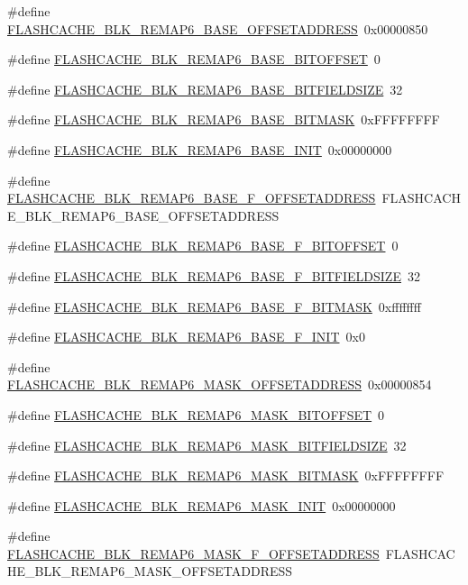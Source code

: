 \begin{DoxyCompactItemize}
\#define \hyperlink{a00550_af8e627f0b0dd219fde52ab8b79c9d9b9}{FLASHCACHE\_\-BLK\_\-REMAP6\_\-BASE\_\-OFFSETADDRESS}~0x00000850
\item 
\#define \hyperlink{a00550_a34ee6956222c5039352f344edfe1ee03}{FLASHCACHE\_\-BLK\_\-REMAP6\_\-BASE\_\-BITOFFSET}~0
\item 
\#define \hyperlink{a00550_aaa5796bf009a6acbde40d9f6489a9ce3}{FLASHCACHE\_\-BLK\_\-REMAP6\_\-BASE\_\-BITFIELDSIZE}~32
\item 
\#define \hyperlink{a00550_a2fa8013a760a149ba5d13ec18d8b7ba6}{FLASHCACHE\_\-BLK\_\-REMAP6\_\-BASE\_\-BITMASK}~0xFFFFFFFF
\item 
\#define \hyperlink{a00550_a15415f674897444a17d31919bdd2558e}{FLASHCACHE\_\-BLK\_\-REMAP6\_\-BASE\_\-INIT}~0x00000000
\item 
\#define \hyperlink{a00550_a24c0b7a5e540f259d7db0150a0430a7b}{FLASHCACHE\_\-BLK\_\-REMAP6\_\-BASE\_\-F\_\-OFFSETADDRESS}~FLASHCACHE\_\-BLK\_\-REMAP6\_\-BASE\_\-OFFSETADDRESS
\item 
\#define \hyperlink{a00550_a7b17e483f06c9a00b964d4e48ea14049}{FLASHCACHE\_\-BLK\_\-REMAP6\_\-BASE\_\-F\_\-BITOFFSET}~0
\item 
\#define \hyperlink{a00550_a5540f4068e1d5ac53f812a72092077ab}{FLASHCACHE\_\-BLK\_\-REMAP6\_\-BASE\_\-F\_\-BITFIELDSIZE}~32
\item 
\#define \hyperlink{a00550_a6b10d8ab83517ea3df8f266701e5ce7e}{FLASHCACHE\_\-BLK\_\-REMAP6\_\-BASE\_\-F\_\-BITMASK}~0xffffffff
\item 
\#define \hyperlink{a00550_aa2a2145cc87bacc938c037f4e1a9e2ac}{FLASHCACHE\_\-BLK\_\-REMAP6\_\-BASE\_\-F\_\-INIT}~0x0
\item 
\#define \hyperlink{a00550_a4e507d74c314fdc4247c74dd8d91cb2e}{FLASHCACHE\_\-BLK\_\-REMAP6\_\-MASK\_\-OFFSETADDRESS}~0x00000854
\item 
\#define \hyperlink{a00550_aac3a457e5375dd8699a5629ce3bf59ed}{FLASHCACHE\_\-BLK\_\-REMAP6\_\-MASK\_\-BITOFFSET}~0
\item 
\#define \hyperlink{a00550_a77a80e767642694d5430099f3675203f}{FLASHCACHE\_\-BLK\_\-REMAP6\_\-MASK\_\-BITFIELDSIZE}~32
\item 
\#define \hyperlink{a00550_ad4c6d6c489d6045e768143afd8cbd282}{FLASHCACHE\_\-BLK\_\-REMAP6\_\-MASK\_\-BITMASK}~0xFFFFFFFF
\item 
\#define \hyperlink{a00550_ab620f9e390b937187c497a054a5731b8}{FLASHCACHE\_\-BLK\_\-REMAP6\_\-MASK\_\-INIT}~0x00000000
\item 
\#define \hyperlink{a00550_a15c4b7b7818599886918428b615d51f7}{FLASHCACHE\_\-BLK\_\-REMAP6\_\-MASK\_\-F\_\-OFFSETADDRESS}~FLASHCACHE\_\-BLK\_\-REMAP6\_\-MASK\_\-OFFSETADDRESS

\end{DoxyCompactItemize}
